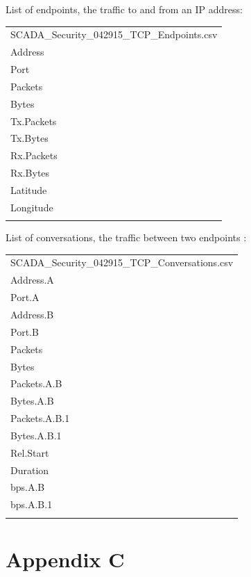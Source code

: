 \documentclass[11pt,]{article}
\begin{document}
List of endpoints, the traffic to and from an IP address:

\begin{longtable}[c]{@{}l@{}}
\toprule\addlinespace
SCADA\_Security\_042915\_TCP\_Endpoints.csv
\\\addlinespace
\midrule\endhead
Address
\\\addlinespace
Port
\\\addlinespace
Packets
\\\addlinespace
Bytes
\\\addlinespace
Tx.Packets
\\\addlinespace
Tx.Bytes
\\\addlinespace
Rx.Packets
\\\addlinespace
Rx.Bytes
\\\addlinespace
Latitude
\\\addlinespace
Longitude
\\\addlinespace
\bottomrule
\end{longtable}

List of conversations, the traffic between two endpoints :

\begin{longtable}[c]{@{}l@{}}
\toprule\addlinespace
SCADA\_Security\_042915\_TCP\_Conversations.csv
\\\addlinespace
\midrule\endhead
Address.A
\\\addlinespace
Port.A
\\\addlinespace
Address.B
\\\addlinespace
Port.B
\\\addlinespace
Packets
\\\addlinespace
Bytes
\\\addlinespace
Packets.A.B
\\\addlinespace
Bytes.A.B
\\\addlinespace
Packets.A.B.1
\\\addlinespace
Bytes.A.B.1
\\\addlinespace
Rel.Start
\\\addlinespace
Duration
\\\addlinespace
bps.A.B
\\\addlinespace
bps.A.B.1
\\\addlinespace
\bottomrule
\end{longtable}

\clearpage

\section*{Appendix C}\label{appendix-c}
\end{document}
